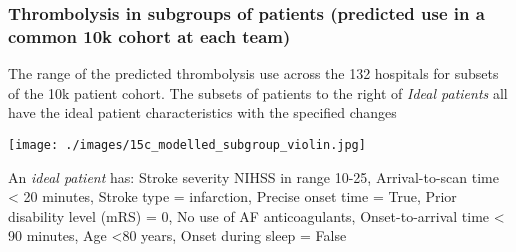 \begin{frame}
\frametitle{Thrombolysis in subgroups of patients (predicted use in a common 10k cohort at each team)}

\footnotesize The range of the predicted thrombolysis use across the 132 hospitals for subsets of the 10k patient cohort. The subsets of patients to the right of \emph{Ideal patients} all have the ideal patient characteristics with the specified changes

\begin{center}
\texttt{[image: ./images/15c\_modelled\_subgroup\_violin.jpg]}
\end{center}

\scriptsize An \emph{ideal patient} has: Stroke severity NIHSS in range 10-25, Arrival-to-scan time \textless{} 20 minutes, Stroke type = infarction, Precise onset time = True, Prior disability level (mRS) = 0, No use of AF anticoagulants, Onset-to-arrival time \textless{} 90 minutes, Age \textless{80 years}, Onset during sleep = False
\end{frame}